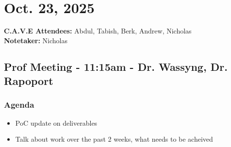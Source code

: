 	\pagebreak
	\section*{Oct. 23, 2025}

	\textbf{C.A.V.E Attendees:} Abdul, Tabish, Berk, Andrew, Nicholas\\
	\textbf{Notetaker:} Nicholas

	\subsection*{Prof Meeting - 11:15am - Dr. Wassyng, Dr. Rapoport}
		\subsubsection*{Agenda}
			\begin{itemize}
				\item PoC update on deliverables
				\item Talk about work over the past 2 weeks, what needs to be acheived
			\end{itemize}

